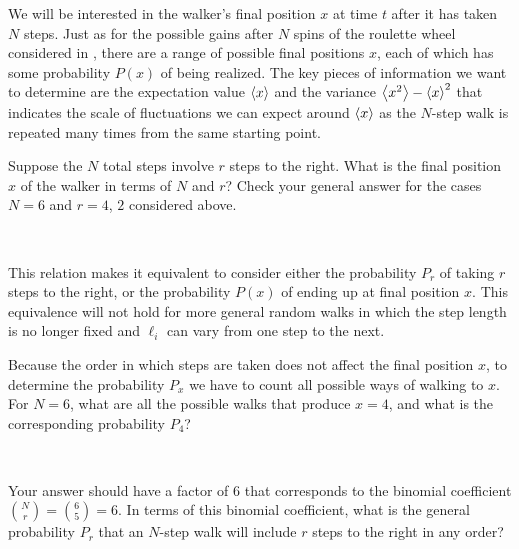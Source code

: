 We will be interested in the walker's final position $x$ at time $t$ after it has taken $N$ steps.
Just as for the possible gains after $N$ spins of the roulette wheel considered in , there are a range of possible final positions $x$, each of which has some probability $P(x)$ of being realized.
The key pieces of information we want to determine are the expectation value $\left\langle x \right\rangle$ and the variance $\left\langle x^2 \right\rangle - \left\langle x \right\rangle^2$ that indicates the scale of fluctuations we can expect around $\left\langle x \right\rangle$ as the $N$-step walk is repeated many times from the same starting point.

Suppose the $N$ total steps involve $r$ steps to the right.
What is the final position $x$ of the walker in terms of $N$ and $r$?
Check your general answer for the cases $N = 6$ and $r = 4$, $2$ considered above.
\begin{mdframed}
  \ \\[100 pt]
\end{mdframed}
This relation makes it equivalent to consider either the probability $P_r$ of taking $r$ steps to the right, or the probability $P(x)$ of ending up at final position $x$.
This equivalence will not hold for more general random walks in which the step length is no longer fixed and $\ell_i$ can vary from one step to the next.

\newpage %
Because the order in which steps are taken does not affect the final position $x$, to determine the probability $P_x$ we have to count all possible ways of walking to $x$.
For $N = 6$, what are all the possible walks that produce $x = 4$, and what is the corresponding probability $P_4$?
\begin{mdframed}
  \ \\[100 pt]
\end{mdframed}
Your answer should have a factor of $6$ that corresponds to the binomial coefficient $\binom{N}{r} = \binom{6}{5} = 6$.
In terms of this binomial coefficient, what is the general probability $P_r$ that an $N$-step walk will include $r$ steps to the right in any order?
\begin{mdframed}
  \ \\[100 pt]
\end{mdframed}

